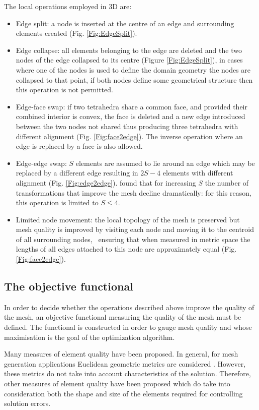 The local operations employed in 3D are:
\begin{itemize}
\item{Edge split:} a node is inserted at the centre of an edge and
  surrounding elements created (Fig. \ref{Fig:EdgeSplit}).
\item{Edge collapse:} all elements belonging to the edge are deleted
  and the two nodes of the edge collapsed to its centre (Figure
  \ref{Fig:EdgeSplit}), in cases where one of the nodes is used to
  define the domain geometry the nodes are collapsed to that point, if
  both nodes define some geometrical structure then this operation is
  not permitted.
\item{Edge-face swap:} if two tetrahedra share a common face, and
  provided their combined interior is convex, the face is deleted and
  a new edge introduced between the two nodes not shared thus
  producing three tetrahedra with different alignment
  (Fig. \ref{Fig:face2edge}). The inverse operation where an edge is
  replaced by a face is also allowed.
\item{Edge-edge swap:} $S$ elements are assumed to lie around an edge
  which may be replaced by a different edge resulting in $2S-4$
  elements with different alignment (Fig. \ref{Fig:edge2edge}).
  \cite{freitag1997} found that for increasing $S$ the number of
  transformations that improve the mesh decline dramatically: for this
  reason, this operation is limited to $S\le 4$.
\item{Limited node movement:} the local topology of the mesh is
  preserved but mesh quality is improved by visiting each node and
  moving it to the centroid of all surrounding nodes, \ie\  ensuring
  that when measured in metric space the lengths of all edges attached
  to this node are approximately equal (Fig. \ref{Fig:face2edge}).
\end{itemize}

\subsection{The objective functional}
In order to decide whether the operations described above improve the
quality of the mesh, an objective functional measuring the quality of
the mesh must be defined.  The functional is constructed in order to
gauge mesh quality and whose maximisation is the goal of the
optimization algorithm.

Many measures of element quality have been proposed. In general, for
mesh generation applications Euclidean geometric metrics are
considered \cite{knupp2000achievingI,
  knupp2000achievingII}. However, these metrics do not take into
account characteristics of the solution. Therefore, other measures of
element quality have been proposed which do take into consideration both
the shape and size of the elements required for controlling solution
errors.

